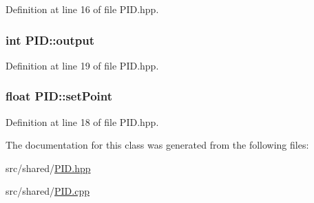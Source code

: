 Definition at line 16 of file P\-I\-D.\-hpp.

\hypertarget{classPID_a34f2887b625d8d49e546b4e2fb389d04}{
\subsubsection[{output}]{\setlength{\rightskip}{0pt plus 5cm}int P\-I\-D\-::output}}\label{classPID_a34f2887b625d8d49e546b4e2fb389d04}


Definition at line 19 of file P\-I\-D.\-hpp.

\hypertarget{classPID_aab66dffb3291ee486568e8b73cb71831}{
\subsubsection[{set\-Point}]{\setlength{\rightskip}{0pt plus 5cm}float P\-I\-D\-::set\-Point}}\label{classPID_aab66dffb3291ee486568e8b73cb71831}


Definition at line 18 of file P\-I\-D.\-hpp.



The documentation for this class was generated from the following files\-:\begin{DoxyCompactItemize}
\item 
src/shared/\hyperlink{PID_8hpp}{P\-I\-D.\-hpp}\item 
src/shared/\hyperlink{PID_8cpp}{P\-I\-D.\-cpp}\end{DoxyCompactItemize}
